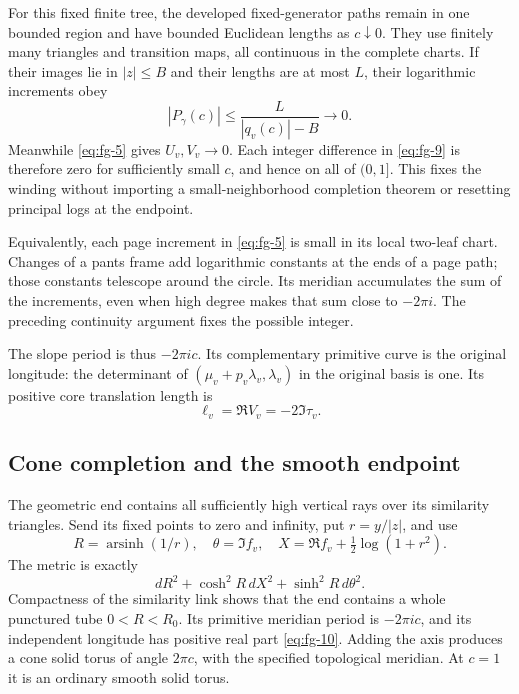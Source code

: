 For this fixed finite tree, the developed fixed-generator paths remain in one bounded region and have bounded Euclidean lengths as \(c\downarrow0\). They use finitely many triangles and transition maps, all continuous in the complete charts. If their images lie in \(|z|\le B\) and their lengths are at most \(L\), their logarithmic increments obey
\begin{equation}
|P_\gamma(c)|\le\frac{L}{|q_v(c)|-B}\longrightarrow0.
\label{eq:fg-9a}
\end{equation}
Meanwhile \eqref{eq:fg-5} gives \(U_v,V_v\to0\). Each integer difference in \eqref{eq:fg-9} is therefore zero for sufficiently small \(c\), and hence on all of \((0,1]\). This fixes the winding without importing a small-neighborhood completion theorem or resetting principal logs at the endpoint.

Equivalently, each page increment in \eqref{eq:fg-5} is small in its local two-leaf chart. Changes of a pants frame add logarithmic constants at the ends of a page path; those constants telescope around the circle. Its meridian accumulates the sum of the increments, even when high degree makes that sum close to \(-2\pi i\). The preceding continuity argument fixes the possible integer.

The slope period is thus \(-2\pi ic\). Its complementary primitive curve is the original longitude: the determinant of \((\mu_v+p_v\lambda_v,\lambda_v)\) in the original basis is one. Its positive core translation length is
\begin{equation}
\ell_v=\Re V_v=-2\Im\tau_v.
\label{eq:fg-10}
\end{equation}

\subsection{Cone completion and the smooth endpoint}\label{sec:fg-5}

The geometric end contains all sufficiently high vertical rays over its similarity triangles. Send its fixed points to zero and infinity, put \(r=y/|z|\), and use
\begin{equation}
R=\operatorname{arsinh}(1/r),\quad
 \theta=\Im f_v,\quad
 X=\Re f_v+\tfrac12\log(1+r^2).
\label{eq:fg-11}
\end{equation}
The metric is exactly
\begin{equation}
dR^2+\cosh^2R\,dX^2+\sinh^2R\,d\theta^2.
\label{eq:fg-12}
\end{equation}
Compactness of the similarity link shows that the end contains a whole punctured tube \(0<R<R_0\). Its primitive meridian period is \(-2\pi ic\), and its independent longitude has positive real part \eqref{eq:fg-10}. Adding the axis produces a cone solid torus of angle \(2\pi c\), with the specified topological meridian. At \(c=1\) it is an ordinary smooth solid torus.

